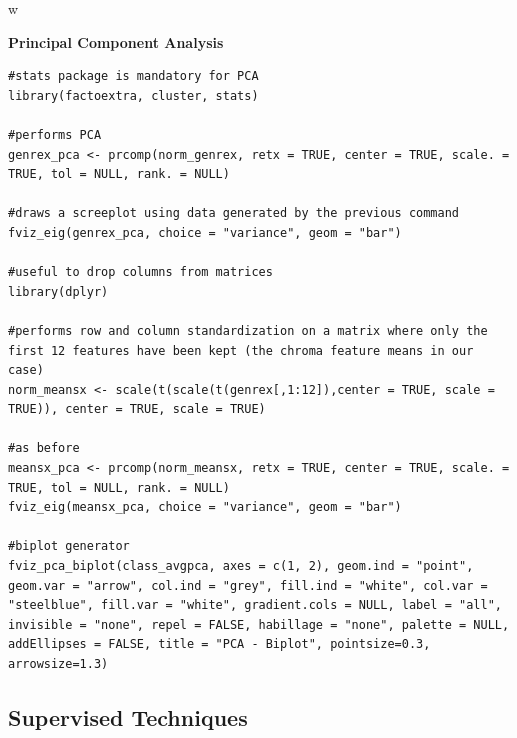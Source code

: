 w\documentclass[11pt, oneside]{article}
\begin{document}
\vspace{1cm}

\noindent\textbf{Principal Component Analysis}

\begin{lstlisting}
#stats package is mandatory for PCA
library(factoextra, cluster, stats)

#performs PCA
genrex_pca <- prcomp(norm_genrex, retx = TRUE, center = TRUE, scale. = TRUE, tol = NULL, rank. = NULL)

#draws a screeplot using data generated by the previous command
fviz_eig(genrex_pca, choice = "variance", geom = "bar")

#useful to drop columns from matrices
library(dplyr)

#performs row and column standardization on a matrix where only the first 12 features have been kept (the chroma feature means in our case)
norm_meansx <- scale(t(scale(t(genrex[,1:12]),center = TRUE, scale = TRUE)), center = TRUE, scale = TRUE)

#as before
meansx_pca <- prcomp(norm_meansx, retx = TRUE, center = TRUE, scale. = TRUE, tol = NULL, rank. = NULL)
fviz_eig(meansx_pca, choice = "variance", geom = "bar")

#biplot generator
fviz_pca_biplot(class_avgpca, axes = c(1, 2), geom.ind = "point", geom.var = "arrow", col.ind = "grey", fill.ind = "white", col.var = "steelblue", fill.var = "white", gradient.cols = NULL, label = "all", invisible = "none", repel = FALSE, habillage = "none", palette = NULL, addEllipses = FALSE, title = "PCA - Biplot", pointsize=0.3, arrowsize=1.3)
\end{lstlisting}

\vspace{0.7cm}

\subsection{Supervised Techniques}

\vspace{0.5cm}
\end{document}

